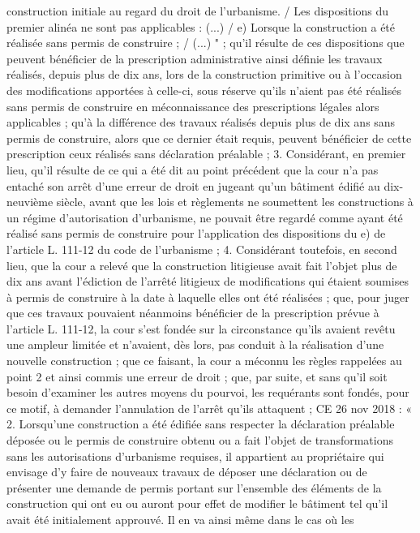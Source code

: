 \documentclass[11pt,a4paper]{report}
\begin{document}
	construction initiale au regard du droit de l'urbanisme. / Les dispositions du premier alinéa ne sont pas
	applicables : (...) / e) Lorsque la construction a été réalisée sans permis de construire ; / (...) " ; qu'il résulte de
	ces dispositions que peuvent bénéficier de la prescription administrative ainsi définie les travaux réalisés, depuis
	plus de dix ans, lors de la construction primitive ou à l'occasion des modifications apportées à celle-ci, sous
	réserve qu'ils n'aient pas été réalisés sans permis de construire en méconnaissance des prescriptions légales
	alors applicables ; qu'à la différence des travaux réalisés depuis plus de dix ans sans permis de construire, alors
	que ce dernier était requis, peuvent bénéficier de cette prescription ceux réalisés sans déclaration préalable ;
	3. Considérant, en premier lieu, qu'il résulte de ce qui a été dit au point précédent que la cour n'a pas entaché
	son arrêt d'une erreur de droit en jugeant qu'un bâtiment édifié au dix-neuvième siècle, avant que les lois et
	règlements ne soumettent les constructions à un régime d'autorisation d'urbanisme, ne pouvait être regardé
	comme ayant été réalisé sans permis de construire pour l'application des dispositions du e) de l'article L. 111-12
	du code de l'urbanisme ;
	4. Considérant toutefois, en second lieu, que la cour a relevé que la construction litigieuse avait fait l'objet plus
	de dix ans avant l'édiction de l'arrêté litigieux de modifications qui étaient soumises à permis de construire à la
	date à laquelle elles ont été réalisées ; que, pour juger que ces travaux pouvaient néanmoins bénéficier de la
	prescription prévue à l'article L. 111-12, la cour s'est fondée sur la circonstance qu'ils avaient revêtu une
	ampleur limitée et n'avaient, dès lors, pas conduit à la réalisation d'une nouvelle construction ; que ce faisant, la
	cour a méconnu les règles rappelées au point 2 et ainsi commis une erreur de droit ; que, par suite, et sans qu'il
	soit besoin d'examiner les autres moyens du pourvoi, les requérants sont fondés, pour ce motif, à demander
	l'annulation de l'arrêt qu'ils attaquent ;
	CE 26 nov 2018  : « 2. Lorsqu'une construction a été édifiée sans respecter la déclaration préalable
	déposée ou le permis de construire obtenu ou a fait l'objet de transformations sans les autorisations d'urbanisme
	requises, il appartient au propriétaire qui envisage d'y faire de nouveaux travaux de déposer une déclaration ou
	de présenter une demande de permis portant sur l'ensemble des éléments de la construction qui ont eu ou auront
	pour effet de modifier le bâtiment tel qu'il avait été initialement approuvé. Il en va ainsi même dans le cas où les
\end{document}
